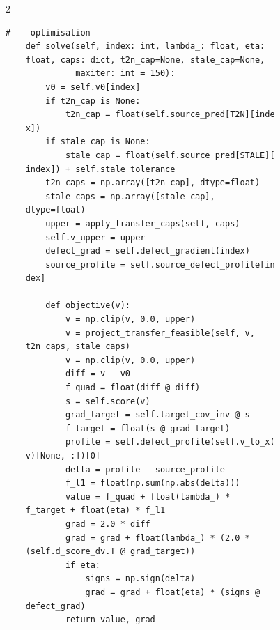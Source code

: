 \begin{multicols}{2}
\begin{Verbatim}[fontsize=\scriptsize]
    # -- optimisation
    def solve(self, index: int, lambda_: float, eta:
    float, caps: dict, t2n_cap=None, stale_cap=None,
              maxiter: int = 150):
        v0 = self.v0[index]
        if t2n_cap is None:
            t2n_cap = float(self.source_pred[T2N][inde
    x])
        if stale_cap is None:
            stale_cap = float(self.source_pred[STALE][
    index]) + self.stale_tolerance
        t2n_caps = np.array([t2n_cap], dtype=float)
        stale_caps = np.array([stale_cap],
    dtype=float)
        upper = apply_transfer_caps(self, caps)
        self.v_upper = upper
        defect_grad = self.defect_gradient(index)
        source_profile = self.source_defect_profile[in
    dex]

        def objective(v):
            v = np.clip(v, 0.0, upper)
            v = project_transfer_feasible(self, v,
    t2n_caps, stale_caps)
            v = np.clip(v, 0.0, upper)
            diff = v - v0
            f_quad = float(diff @ diff)
            s = self.score(v)
            grad_target = self.target_cov_inv @ s
            f_target = float(s @ grad_target)
            profile = self.defect_profile(self.v_to_x(
    v)[None, :])[0]
            delta = profile - source_profile
            f_l1 = float(np.sum(np.abs(delta)))
            value = f_quad + float(lambda_) *
    f_target + float(eta) * f_l1
            grad = 2.0 * diff
            grad = grad + float(lambda_) * (2.0 *
    (self.d_score_dv.T @ grad_target))
            if eta:
                signs = np.sign(delta)
                grad = grad + float(eta) * (signs @
    defect_grad)
            return value, grad


\end{Verbatim}
\end{multicols}

